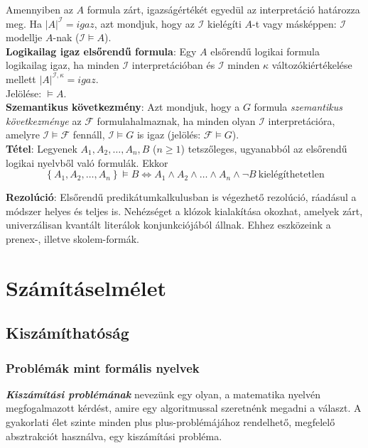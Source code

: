 \documentclass[tikz,12pt,margin=0px]{article}
\newcommand\lword[1]{\leavevmode\nobreak\hskip0pt plus\linewidth\penalty50\hskip0pt plus-\linewidth\nobreak #1}
\begin{document}
    \noindent Amennyiben az $A$ formula zárt, igazságértékét egyedül az interpretáció határozza meg. Ha $|A|^{\mathcal{I}} = igaz$, azt mondjuk, hogy az $\mathcal{I}$ kielégíti $A$-t vagy másképpen: $\mathcal{I}$ modellje $A$-nak ($\mathcal{I} \models A$).\\
	
    \noindent \textbf{Logikailag igaz elsőrendű formula}: Egy $A$ elsőrendű logikai formula logikailag igaz, ha minden $\mathcal{I}$ interpretációban és $\mathcal{I}$ minden $\kappa$ változókiértékelése mellett $|A|^{\mathcal{I},\kappa} = igaz$.\\
    Jelölése: $\models A$.\\
	
	\noindent \textbf{Szemantikus következmény}: Azt mondjuk, hogy a $G$ formula \textit{szemantikus következménye} az
	$\mathcal{F}$ formulahalmaznak, ha minden olyan $\mathcal{I}$ interpretációra, amelyre $\mathcal{I} \models \mathcal{F}$
	fennáll, $\mathcal{I} \models G$ is igaz (jelölés: $\mathcal{F} \models G$).\\
	
	\noindent \textbf{Tétel}: Legyenek $A_{1}, A_{2}, \ldots, A_{n}, B$ ($n \geq 1$) tetszőleges, ugyanabból az elsőrendű logikai nyelvből való formulák. Ekkor
    \[
        \left\{A_{1}, A_{2}, \ldots, A_{n}\right\} \models B \Leftrightarrow A_{1} \wedge A_{2} \wedge \ldots \wedge A_{n} \wedge \neg B\ \text{kielégíthetetlen}
    \]
	
    \noindent \textbf{Rezolúció}: Elsőrendű predikátumkalkulusban is végezhető rezolúció, ráadásul a módszer helyes és teljes is. Nehézséget a klózok kialakítása okozhat, amelyek zárt,
	univerzálisan kvantált literálok konjunkciójából állnak. Ehhez eszközeink a prenex-, illetve skolem-formák.
	
	\section*{Számításelmélet}
	
	\subsection*{Kiszámíthatóság}

	\subsubsection*{Problémák mint formális nyelvek}	

    \noindent \emph{\textbf{Kiszámítási problémának}} nevezünk egy olyan, a matematika nyelvén megfogalmazott kérdést, amire egy algoritmussal szeretnénk megadni a választ. A gyakorlati élet szinte minden \lword{problémájához} rendelhető, megfelelő absztrakciót használva, egy kiszámítási probléma.\\
	
\end{document}
